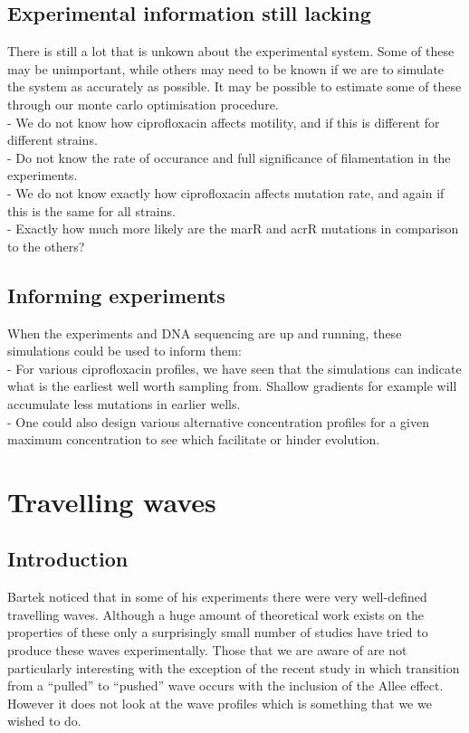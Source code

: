 \documentclass[a4paper,10pt]{article}
\begin{document}
\subsection{Experimental information still lacking}
There is still a lot that is unkown about the experimental system. Some of these may be unimportant, while others may need to be known 
if we are to simulate the system as accurately as possible. It may be possible to estimate some of these through our monte carlo optimisation procedure.\\
- We do not know how ciprofloxacin affects motility, and if this is different for different strains.\\
- Do not know the rate of occurance and full significance of filamentation in the experiments.\\
- We do not know exactly how ciprofloxacin affects mutation rate, and again if this is the same for all strains.\\
- Exactly how much more likely are the marR and acrR mutations in comparison to the others?\\
 



\subsection{Informing experiments}
When the experiments and DNA sequencing are up and running, these simulations could be used to inform them:\\
- For various ciprofloxacin profiles, we have seen that the simulations can indicate what is the earliest well worth sampling from. Shallow gradients for example will 
accumulate less mutations in earlier wells.\\
- One could also design various alternative concentration profiles for a given maximum concentration to see which facilitate or hinder evolution.\\








 \clearpage
 \newpage


 
 
\section{Travelling waves}


\subsection{Introduction}
Bartek noticed that in some of his experiments there were very well-defined travelling waves. Although a huge amount of theoretical work exists on the properties of these only a surprisingly
small number of studies have tried to produce these waves experimentally. Those that we are aware of \cite{} are not particularly interesting with the exception of the recent study
\cite{} in which transition from a ``pulled'' to ``pushed'' wave occurs with the inclusion of the Allee effect. However it does not look at the wave profiles which is something that we
we wished to do.\\
\end{document}
